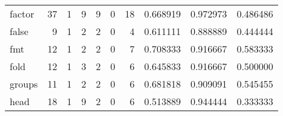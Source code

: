 \begin{tabular}{lrrrrrrrrr}
factor    &                                      37 &                                                  1 &                                                  9 &                                                  9 &                                                  0 &                                                 18 &                                           0.668919 &                               0.972973 &                             0.486486 \\
false     &                                       9 &                                                  1 &                                                  2 &                                                  2 &                                                  0 &                                                  4 &                                           0.611111 &                               0.888889 &                             0.444444 \\
fmt       &                                      12 &                                                  1 &                                                  2 &                                                  2 &                                                  0 &                                                  7 &                                           0.708333 &                               0.916667 &                             0.583333 \\
fold      &                                      12 &                                                  1 &                                                  3 &                                                  2 &                                                  0 &                                                  6 &                                           0.645833 &                               0.916667 &                             0.500000 \\
groups    &                                      11 &                                                  1 &                                                  2 &                                                  2 &                                                  0 &                                                  6 &                                           0.681818 &                               0.909091 &                             0.545455 \\
head      &                                      18 &                                                  1 &                                                  9 &                                                  2 &                                                  0 &                                                  6 &                                           0.513889 &                               0.944444 &                             0.333333 \\

\end{tabular}

